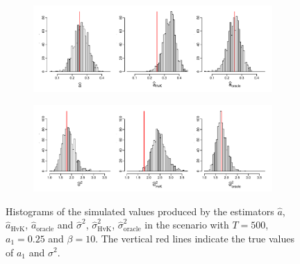 \begin{figure}[t!]
\centering
\begin{subfigure}[b]{\textwidth}
\includegraphics[width=\textwidth]{Plots/a_hat_histograms_a1=25_T=500_slope=100_(L1,L2,K1,K2,M1,M2)=(25,25,5,10,20,30).pdf}
\end{subfigure}
\begin{subfigure}[b]{\textwidth}
\includegraphics[width=\textwidth]{Plots/lrv_histograms_a1=25_T=500_slope=100_(L1,L2,K1,K2,M1,M2)=(25,25,5,10,20,30).pdf}
\end{subfigure}
\caption{Histograms of the simulated values produced by the estimators $\widehat{a}$, $\widehat{a}_{\text{HvK}}$, $\widehat{a}_{\text{oracle}}$ and $\widehat{\sigma}^2$, $\widehat{\sigma}^2_{\text{HvK}}$, $\widehat{\sigma}^2_{\text{oracle}}$ in the scenario with $T=500$, $a_1 = 0.25$ and $\beta = 10$. The vertical red lines indicate the true values of $a_1$ and $\sigma^2$.}\label{fig:hist_scenario2} 
\end{figure}



